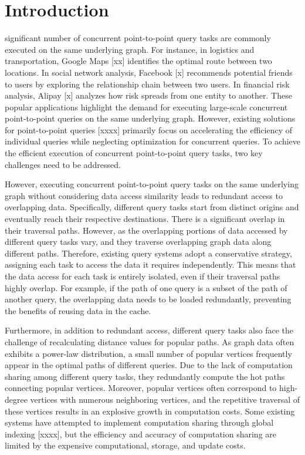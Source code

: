 \documentclass[lettersize,journal]{IEEEtran} %
\begin{document}
\section{Introduction}
 significant number of concurrent point-to-point query tasks are commonly executed on the same underlying graph. For instance, in logistics and transportation, Google Maps [xx] identifies the optimal route between two locations. In social network analysis, Facebook [x] recommends potential friends to users by exploring the relationship chain between two users. In financial risk analysis, Alipay [x] analyzes how risk spreads from one entity to another. These popular applications highlight the demand for executing large-scale concurrent point-to-point queries on the same underlying graph. However, existing solutions for point-to-point queries [xxxx] primarily focus on accelerating the efficiency of individual queries while neglecting optimization for concurrent queries. To achieve the efficient execution of concurrent point-to-point query tasks, two key challenges need to be addressed.


However, executing concurrent point-to-point query tasks on the same underlying graph without considering data access similarity leads to redundant access to overlapping data. Specifically, different query tasks start from distinct origins and eventually reach their respective destinations. There is a significant overlap in their traversal paths. However, as the overlapping portions of data accessed by different query tasks vary, and they traverse overlapping graph data along different paths. Therefore, existing query systems adopt a conservative strategy, assigning each task to access the data it requires independently. This means that the data access for each task is entirely isolated, even if their traversal paths highly overlap. For example, if the path of one query is a subset of the path of another query, the overlapping data needs to be loaded redundantly, preventing the benefits of reusing data in the cache.

Furthermore, in addition to redundant access, different query tasks also face the challenge of recalculating distance values for popular paths. As graph data often exhibits a power-law distribution, a small number of popular vertices frequently appear in the optimal paths of different queries. Due to the lack of computation sharing among different query tasks, they redundantly compute the hot paths connecting popular vertices. Moreover, popular vertices often correspond to high-degree vertices with numerous neighboring vertices, and the repetitive traversal of these vertices results in an explosive growth in computation costs. Some existing systems have attempted to implement computation sharing through global indexing [xxxx], but the efficiency and accuracy of computation sharing are limited by the expensive computational, storage, and update costs.
\end{document}
